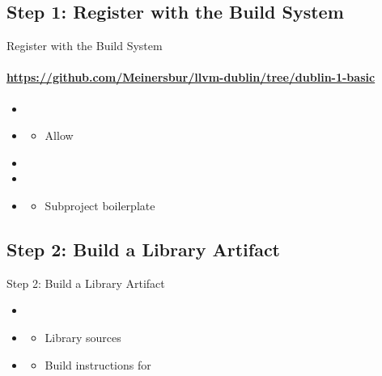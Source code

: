 \subsection{Step 1: Register with the \LLVM Build System}
\begin{frame}[fragile]{Register with the \LLVM Build System}
\framesubtitle{\url{https://github.com/Meinersbur/llvm-dublin/tree/dublin-1-basic}}
\begin{itemize}
  \item[\pgfuseimage{file}] 
  \item[\pgfuseimage{file}] 
  \begin{itemize}
      \item Allow 
  \end{itemize}

  \item[\pgfuseimage{file}] 
  \item[\pgfuseimage{file}] 
  \item[\pgfuseimage{file}] 
  \begin{itemize}
    \item Subproject boilerplate
  \end{itemize}
\end{itemize}
\end{frame}



\subsection{Step 2: Build a Library Artifact}
\begin{frame}[fragile]{Step 2: Build a Library Artifact}
\begin{itemize}
\item[\pgfuseimage{file}] 
\item[\pgfuseimage{file}] 
  \begin{itemize}
    \item Library sources
  \end{itemize}

\item[\pgfuseimage{file}] 
  \begin{itemize}
    \item Build instructions for 
  \end{itemize}
\end{itemize}
\end{frame}



